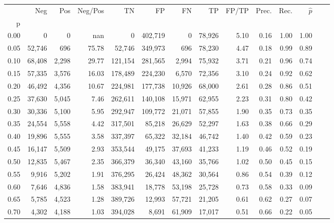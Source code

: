 \begin{tabular}{rrrrrrrrrrrrrr}
\toprule
{} &     Neg &    Pos & Neg/Pos &       TN &       FP &      FN &      TP & FP/TP & Prec. &  Rec. & $\hat{p}$ \\
p    &         &        &         &          &          &         &         &       &       &       &           \\
\midrule
0.00 &       0 &      0 &     nan &        0 &  402,719 &       0 &  78,926 &  5.10 &  0.16 &  1.00 &      1.00 \\
0.05 &  52,746 &    696 &   75.78 &   52,746 &  349,973 &     696 &  78,230 &  4.47 &  0.18 &  0.99 &      0.89 \\
0.10 &  68,408 &  2,298 &   29.77 &  121,154 &  281,565 &   2,994 &  75,932 &  3.71 &  0.21 &  0.96 &      0.74 \\
0.15 &  57,335 &  3,576 &   16.03 &  178,489 &  224,230 &   6,570 &  72,356 &  3.10 &  0.24 &  0.92 &      0.62 \\
0.20 &  46,492 &  4,356 &   10.67 &  224,981 &  177,738 &  10,926 &  68,000 &  2.61 &  0.28 &  0.86 &      0.51 \\
0.25 &  37,630 &  5,045 &    7.46 &  262,611 &  140,108 &  15,971 &  62,955 &  2.23 &  0.31 &  0.80 &      0.42 \\
0.30 &  30,336 &  5,100 &    5.95 &  292,947 &  109,772 &  21,071 &  57,855 &  1.90 &  0.35 &  0.73 &      0.35 \\
0.35 &  24,554 &  5,558 &    4.42 &  317,501 &   85,218 &  26,629 &  52,297 &  1.63 &  0.38 &  0.66 &      0.29 \\
0.40 &  19,896 &  5,555 &    3.58 &  337,397 &   65,322 &  32,184 &  46,742 &  1.40 &  0.42 &  0.59 &      0.23 \\
0.45 &  16,147 &  5,509 &    2.93 &  353,544 &   49,175 &  37,693 &  41,233 &  1.19 &  0.46 &  0.52 &      0.19 \\
0.50 &  12,835 &  5,467 &    2.35 &  366,379 &   36,340 &  43,160 &  35,766 &  1.02 &  0.50 &  0.45 &      0.15 \\
0.55 &   9,916 &  5,202 &    1.91 &  376,295 &   26,424 &  48,362 &  30,564 &  0.86 &  0.54 &  0.39 &      0.12 \\
0.60 &   7,646 &  4,836 &    1.58 &  383,941 &   18,778 &  53,198 &  25,728 &  0.73 &  0.58 &  0.33 &      0.09 \\
0.65 &   5,785 &  4,523 &    1.28 &  389,726 &   12,993 &  57,721 &  21,205 &  0.61 &  0.62 &  0.27 &      0.07 \\
0.70 &   4,302 &  4,188 &    1.03 &  394,028 &    8,691 &  61,909 &  17,017 &  0.51 &  0.66 &  0.22 &      0.05 \\

\end{tabular}
